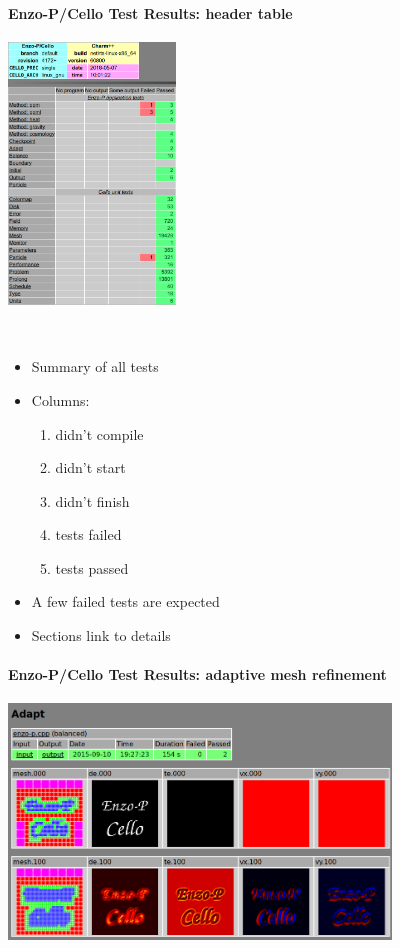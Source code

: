 \begin{frame}[fragile] 
\secframetitle{\ssTesting}
\framesubtitle{Enzo-P/Cello Test Results: header table}
\begin{minipage}{1.75in}
\includegraphics[width=1.75in]{Images/test-1.png}
\end{minipage} \ 
\begin{minipage}{2.25in}
\begin{itemize}
\item Summary of all tests
\item Columns:
\footnotesize
\begin{enumerate}
\item didn't compile
\item didn't start
\item didn't finish
\item tests failed
\item tests passed
\end{enumerate}
\small
\item A few failed tests are expected
\item Sections link to details
\end{itemize}
\end{minipage}
\end{frame}


\begin{frame}[fragile] 
\secframetitle{\ssTesting}
\framesubtitle{Enzo-P/Cello Test Results: adaptive mesh refinement}
\includegraphics[width=4.0in]{Images/cello-test-2.png}
\end{frame}


